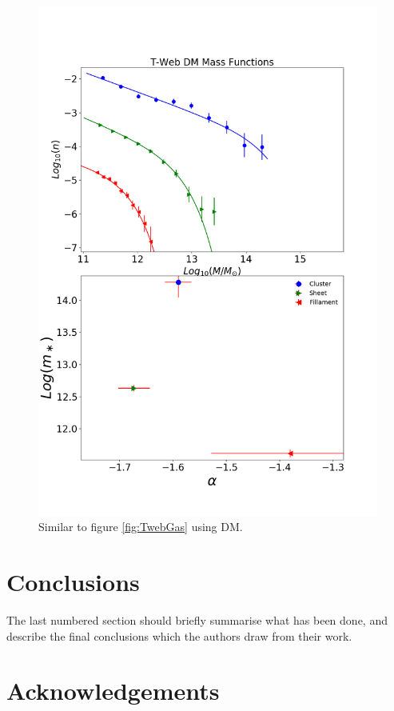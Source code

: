 \documentclass[a4paper,fleqn,usenatbib]{mnras}
\begin{document}
\begin{figure}
	\includegraphics[width=\columnwidth]{./pics/F19_T-Web_DM.png}
    \caption{Similar to figure \ref{fig:TwebGas} using DM.} 
    \label{fig:TwebDM}
\end{figure}





\section{Conclusions}

The last numbered section should briefly summarise what has been done, and describe
the final conclusions which the authors draw from their work.

\section*{Acknowledgements}
\end{document}
